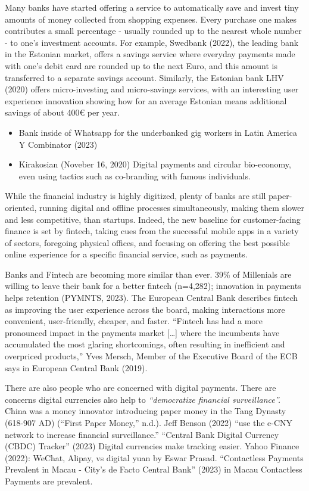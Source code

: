 \documentclass[
  letterpaper,
  DIV=11,
  numbers=noendperiod]{scrartcl}
\providecommand{\tightlist}{%
  \setlength{\itemsep}{0pt}\setlength{\parskip}{0pt}}\usepackage{longtable,booktabs,array}
\begin{document}
Many banks have started offering a service to automatically save and
invest tiny amounts of money collected from shopping expenses. Every
purchase one makes contributes a small percentage - usually rounded up
to the nearest whole number - to one's investment accounts. For example,
Swedbank (2022), the leading bank in the Estonian market, offers a
savings service where everyday payments made with one's debit card are
rounded up to the next Euro, and this amount is transferred to a
separate savings account. Similarly, the Estonian bank LHV (2020) offers
micro-investing and micro-savings services, with an interesting user
experience innovation showing how for an average Estonian means
additional savings of about 400€ per year.

\begin{itemize}
\tightlist
\item
  Bank inside of Whatsapp for the underbanked gig workers in Latin
  America Y Combinator (2023)
\item
  Kirakosian (Noveber 16, 2020) Digital payments and circular
  bio-economy, even using tactics such as co-branding with famous
  individuals.
\end{itemize}

While the financial industry is highly digitized, plenty of banks are
still paper-oriented, running digital and offline processes
simultaneously, making them slower and less competitive, than startups.
Indeed, the new baseline for customer-facing finance is set by fintech,
taking cues from the successful mobile apps in a variety of sectors,
foregoing physical offices, and focusing on offering the best possible
online experience for a specific financial service, such as payments.

Banks and Fintech are becoming more similar than ever. 39\% of
Millenials are willing to leave their bank for a better fintech
(n=4,282); innovation in payments helps retention (PYMNTS, 2023). The
European Central Bank describes fintech as improving the user experience
across the board, making interactions more convenient, user-friendly,
cheaper, and faster. ``Fintech has had a more pronounced impact in the
payments market {[}\ldots{]} where the incumbents have accumulated the
most glaring shortcomings, often resulting in inefficient and overpriced
products,'' Yves Mersch, Member of the Executive Board of the ECB says
in European Central Bank (2019).

There are also people who are concerned with digital payments. There are
concerns digital currencies also help to \emph{``democratize financial
surveillance''.} China was a money innovator introducing paper money in
the Tang Dynasty (618-907 AD) ({``First Paper Money,''} n.d.). Jeff
Benson (2022) ``use the e-CNY network to increase financial
surveillance.'' {``Central {Bank Digital Currency} ({CBDC}) {Tracker}''}
(2023) Digital currencies make tracking easier. Yahoo Finance (2022):
WeChat, Alipay, vs digital yuan by Eswar Prasad. {``Contactless Payments
Prevalent in {Macau} - {City}'s de Facto Central Bank''} (2023) in Macau
Contactless Payments are prevalent.
\end{document}

